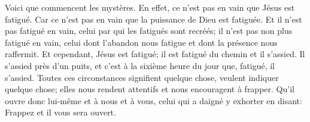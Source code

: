 Voici que commencent les mystères.
	En effet, ce n’est pas en vain que Jésus est fatigué.
Car ce n’est pas en vain que la puissance de Dieu est fatiguée.
Et il n’est pas fatigué en vain, celui par qui les fatigués sont recréés;
	il n’est pas non plus fatigué en vain,
	celui dont l’abandon nous fatigue et dont la présence nous raffermit.
Et cependant, Jésus est fatigué; il est fatigué du chemin et il s’assied.
Il s’assied près d’un puits,
	et c’est à la sixième heure du jour que, fatigué, il s’assied.
Toutes ces circonstances signifient quelque chose,
	veulent indiquer quelque chose;
	elles nous rendent attentifs et nous encouragent à frapper.
Qu’il ouvre donc lui-même et à nous et à vous,
	celui qui a daigné y exhorter en disant:
	Frappez et il vous sera ouvert.
